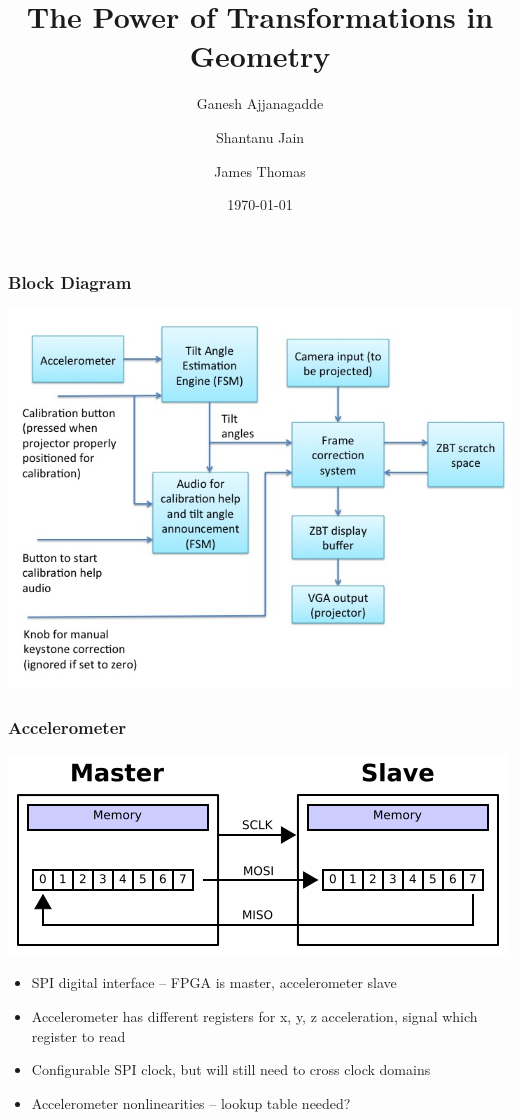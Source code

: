 \documentclass{beamer}
\title{The Power of Transformations in Geometry}
\author{Ganesh Ajjanagadde \and Shantanu Jain \and James Thomas}
\date{\today}
\begin{document}
\maketitle

\begin{frame}
\frametitle{Block Diagram}
\includegraphics[width=\textwidth]{img/block_diag}
\end{frame}

\begin{frame}
\frametitle{Accelerometer}
\includegraphics[scale=0.4]{img/spi}
\begin{itemize}
  \item SPI digital interface -- FPGA is master, accelerometer slave
  \item Accelerometer has different registers for x, y, z acceleration, signal which register to read
  \item Configurable SPI clock, but will still need to cross clock domains
  \item Accelerometer nonlinearities -- lookup table needed?
\end{itemize}
\end{frame}
\end{document}
